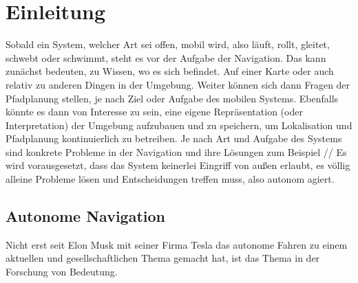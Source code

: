 %


\chapter{Einleitung}


Sobald ein System, welcher Art sei offen, mobil wird, also läuft, rollt, gleitet, schwebt oder schwimmt, steht es vor der Aufgabe der Navigation. Das kann zunächst bedeuten, zu Wissen, wo es sich befindet. Auf einer Karte oder auch relativ zu anderen \glqq Dingen\grqq{}  in der Umgebung. Weiter können sich dann Fragen der Pfadplanung stellen, je nach Ziel oder Aufgabe des mobilen Systems. Ebenfalls könnte es dann von Interesse zu sein, eine eigene Repräsentation (oder Interpretation) der Umgebung aufzubauen und zu speichern, um Lokalisation und Pfadplanung kontinuierlich zu betreiben. Je nach Art und Aufgabe des Systems sind konkrete Probleme in der Navigation und ihre Lösungen zum Beispiel  //
Es wird vorausgesetzt, dass das System keinerlei Eingriff von außen erlaubt, es völlig alleine Probleme lösen und Entscheidungen treffen muss, also autonom agiert.



\section{Autonome Navigation}

Nicht erst seit Elon Musk mit seiner Firma Tesla das autonome Fahren zu einem aktuellen und gesellschaftlichen Thema gemacht hat, ist das Thema in der Forschung von Bedeutung.




